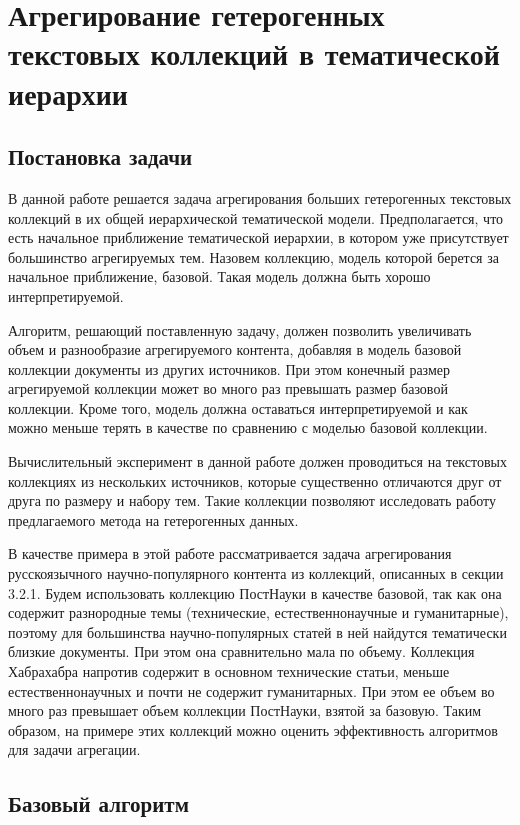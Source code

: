 \chapter{Агрегирование гетерогенных текстовых коллекций в тематической иерархии}
\section{Постановка задачи}

В данной работе решается задача агрегирования больших гетерогенных текстовых коллекций в их общей иерархической тематической модели.
Предполагается, что есть начальное приближение тематической иерархии, в котором уже присутствует большинство агрегируемых тем. Назовем коллекцию, модель которой берется за начальное приближение, базовой. Такая модель должна быть хорошо интерпретируемой.

Алгоритм, решающий поставленную задачу, должен позволить увеличивать объем и разнообразие агрегируемого контента, добавляя в модель базовой коллекции документы из других источников. При этом конечный размер агрегируемой коллекции может во много раз превышать размер базовой коллекции. Кроме того, модель должна оставаться интерпретируемой и как можно меньше терять в качестве по сравнению с моделью базовой коллекции. 

Вычислительный эксперимент в данной работе должен проводиться на текстовых коллекциях из нескольких источников, которые существенно отличаются друг от друга по размеру и набору тем. Такие коллекции позволяют исследовать работу предлагаемого метода на гетерогенных данных.

В качестве примера в этой работе рассматривается задача агрегирования русскоязычного научно-популярного контента из коллекций, описанных в секции 3.2.1.
 Будем использовать коллекцию ПостНауки в качестве базовой, так как она содержит разнородные темы (технические, естественнонаучные и гуманитарные), поэтому для большинства научно-популярных статей в ней найдутся тематически близкие документы. При этом она сравнительно мала по объему.
Коллекция Хабрахабра напротив содержит в основном технические статьи, меньше естественнонаучных и почти не содержит гуманитарных. При этом ее объем во много раз превышает объем коллекции ПостНауки, взятой за базовую. Таким образом, на примере этих коллекций можно оценить эффективность алгоритмов для задачи агрегации.

\section{Базовый алгоритм}

